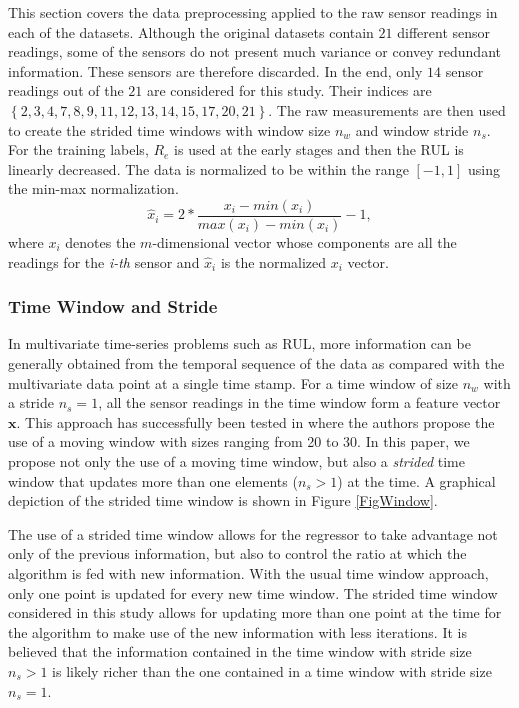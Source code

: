 \documentclass[12pt]{IEEEtran}%
\begin{document}
This section covers the data preprocessing applied to the raw sensor readings
in each of the datasets. Although the original datasets contain $21$ different
sensor readings, some of the sensors do not present much variance or convey
redundant information. These sensors are therefore discarded. In the end, only
$14$ sensor readings out of the $21$ are considered for this study. Their
indices are $\left\lbrace 2, 3, 4, 7, 8, 9, 11, 12, 13, 14, 15, 17, 20, 21
\right\rbrace $. The raw measurements are then used to create the strided time
windows with window size $n_{w}$ and window stride $n_{s}$. For the training
labels, $R_{e}$ is used at the early stages and then the RUL is linearly
decreased. The data is normalized to be within the range $\left[  -1,1
\right]  $ using the min-max normalization.
\begin{equation}
\hat{x}_{i} = 2* \frac{x_{i} - min(x_{i})}{max(x_{i}) - min(x_{i})} - 1,
\label{eq:min_max_norm}%
\end{equation}
where $x_{i}$ denotes the $m$-dimensional vector whose components are all the
readings for the \textit{i-th} sensor and $\hat{x}_{i}$ is the normalized
$x_{i}$ vector.

\subsubsection{Time Window and Stride}

In multivariate time-series problems such as RUL, more information can be
generally obtained from the temporal sequence of the data as compared with the
multivariate data point at a single time stamp. For a time window of size
$n_{w}$ with a stride $n_{s}=1$, all the sensor readings in the time window
form a feature vector $\mathbf{x}$. This approach has successfully been tested
in \cite{Li2018,Lim2016} where the authors propose the use of a moving window
with sizes ranging from 20 to 30. In this paper, we propose not only the use of
a moving time window, but also a \textit{strided} time window that updates
more than one elements ($n_{s}>1$) at the time. A graphical depiction of the
strided time window is shown in Figure \ref{FigWindow}.

The use of a strided time window allows for the regressor to take advantage
not only of the previous information, but also to control the ratio at which
the algorithm is fed with new information. With the usual time window
approach, only one point is updated for every new time window. The strided
time window considered in this study allows for updating more than one point
at the time for the algorithm to make use of the new information with less iterations. It
is believed that the information contained in the time window with stride size
$n_{s}>1$ is likely richer than the one contained in a time window with stride
size $n_{s}=1$.
\end{document}
